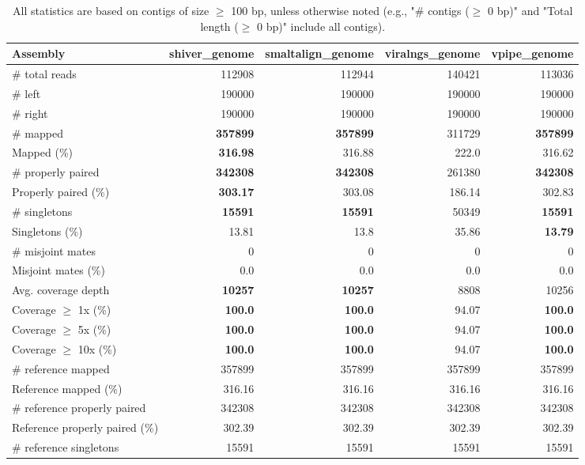 \documentclass[12pt,a4paper]{article}
\begin{document}
\begin{table}[ht]
\begin{center}
\caption{All statistics are based on contigs of size $\geq$ 100 bp, unless otherwise noted (e.g., "\# contigs ($\geq$ 0 bp)" and "Total length ($\geq$ 0 bp)" include all contigs).}
\begin{tabular}{|l*{4}{|r}|}
\hline
Assembly & shiver\_genome & smaltalign\_genome & viralngs\_genome & vpipe\_genome \\ \hline
\# total reads & 112908 & 112944 & 140421 & 113036 \\ \hline
\# left & 190000 & 190000 & 190000 & 190000 \\ \hline
\# right & 190000 & 190000 & 190000 & 190000 \\ \hline
\# mapped & {\bf 357899} & {\bf 357899} & 311729 & {\bf 357899} \\ \hline
Mapped (\%) & {\bf 316.98} & 316.88 & 222.0 & 316.62 \\ \hline
\# properly paired & {\bf 342308} & {\bf 342308} & 261380 & {\bf 342308} \\ \hline
Properly paired (\%) & {\bf 303.17} & 303.08 & 186.14 & 302.83 \\ \hline
\# singletons & {\bf 15591} & {\bf 15591} & 50349 & {\bf 15591} \\ \hline
Singletons (\%) & 13.81 & 13.8 & 35.86 & {\bf 13.79} \\ \hline
\# misjoint mates & 0 & 0 & 0 & 0 \\ \hline
Misjoint mates (\%) & 0.0 & 0.0 & 0.0 & 0.0 \\ \hline
Avg. coverage depth & {\bf 10257} & {\bf 10257} & 8808 & 10256 \\ \hline
Coverage $\geq$ 1x (\%) & {\bf 100.0} & {\bf 100.0} & 94.07 & {\bf 100.0} \\ \hline
Coverage $\geq$ 5x (\%) & {\bf 100.0} & {\bf 100.0} & 94.07 & {\bf 100.0} \\ \hline
Coverage $\geq$ 10x (\%) & {\bf 100.0} & {\bf 100.0} & 94.07 & {\bf 100.0} \\ \hline
\# reference mapped & 357899 & 357899 & 357899 & 357899 \\ \hline
Reference mapped (\%) & 316.16 & 316.16 & 316.16 & 316.16 \\ \hline
\# reference properly paired & 342308 & 342308 & 342308 & 342308 \\ \hline
Reference properly paired (\%) & 302.39 & 302.39 & 302.39 & 302.39 \\ \hline
\# reference singletons & 15591 & 15591 & 15591 & 15591 \\ \hline

\end{tabular}
\end{center}
\end{table}
\end{document}
